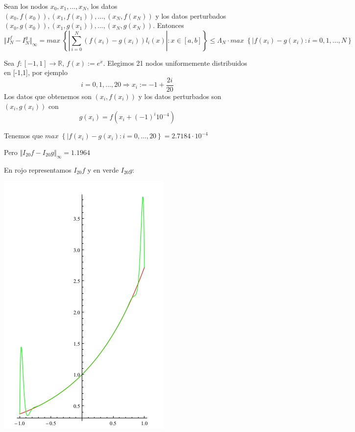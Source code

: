 \begin{nprop}
Sean los nodos $x_0,x_1,...,x_N$, los datos $(x_0,f(x_0)), (x_1,f(x_1)),...,(x_N,f(x_N))$ y los datos perturbados $(x_0,g(x_0)),(x_1,g(x_1)),...,(x_N,g(x_N))$. Entonces
\[ \Vert I_N^f - I_N^g \Vert _\infty = max \; \left\lbrace \left\vert \sum_{i=0}^N (f(x_i)-g(x_i))l_i(x) \right\vert : x \in \left[ a,b \right] \right\rbrace \leq \Lambda _N \cdot max \; \left\lbrace \vert f(x_i)-g(x_i) : i=0,1,...,N \right\rbrace \]
\end{nprop}

\begin{ejemplo}
Sea $f : \left[ -1,1 \right] \longrightarrow \mathbb{R}$, $f(x) := e^x$. Elegimos 21 nodos uniformemente distribuidos en [-1,1], por ejemplo
\[ i=0,1,...,20 \Rightarrow x_i := -1 + \frac{2i}{20} \]
Los datos que obtenemos son $(x_i,f(x_i))$ y los datos perturbados son $(x_i,g(x_i))$ con $$g(x_i)=f(x_i+(-1)^i10^{-4})$$

Tenemos que $max \; \left\lbrace \vert f(x_i)-g(x_i) : i=0,...,20 \right\rbrace = 2.7184 \cdot 10^{-4}$

Pero $\Vert I_{20}f-I_{20}g \Vert _\infty = 1.1964$

En rojo representamos $I_{20}f$ y en verde $I_{20}g$:

\includegraphics[scale=0.3]{media/ej1-5_t2.png}


\end{ejemplo}
